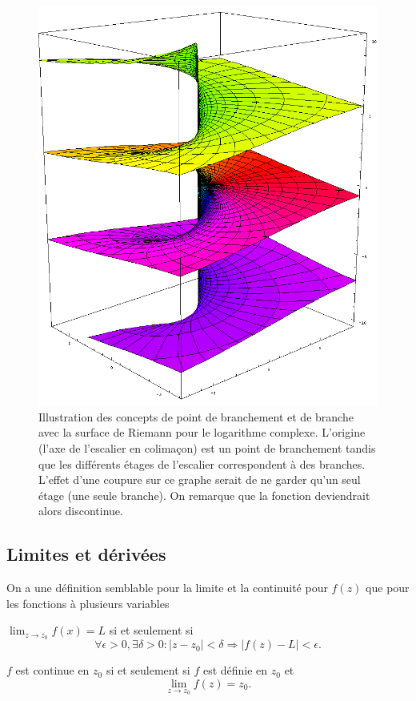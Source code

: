 \begin{figure}[ht!]
	\centering
		\includegraphics[scale=0.20]{riemann_surface_log.jpg}
		\caption{Illustration des concepts de point de branchement et
		de branche avec la surface de Riemann pour le logarithme complexe.
		L'origine (l'axe de l'escalier en colimaçon) est un point de branchement
		tandis que les différents étages de l'escalier correspondent à des branches.
		L'effet d'une coupure sur ce graphe serait de ne garder qu'un seul étage
		(une seule branche). On remarque que la fonction deviendrait alors discontinue.}
		\label{fig:riemann-log}
\end{figure}

\subsection{Limites et dérivées}
On a une définition semblable pour la limite et la continuité
pour $f(z)$ que pour les fonctions à plusieurs variables
\begin{mydef}[Limite]
  $\lim_{z\to z_0} f(x) = L$ si et seulement si
  \[ \forall \epsilon>0, \exists\delta>0:
  |z-z_0|<\delta \Rightarrow |f(z)-L|<\epsilon. \]
\end{mydef}
\begin{mydef}[Continuité]
  $f$ est continue en $z_0$ si et seulement si $f$ est définie en $z_0$ et
  \[ \lim_{z \to z_0} f(z) = z_0. \]
\end{mydef}

